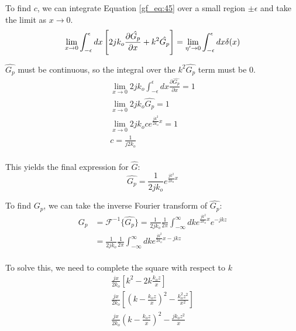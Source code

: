 To find $c$, we can integrate Equation \ref{gf_eq:45} over a small region $\pm\epsilon$ and take the limit as $x\rightarrow 0$.
\begin{equation}
\lim_{x\rightarrow 0}\int_{-\epsilon}^{\epsilon}dx\left[2jk_o\frac{\partial\hat{G_p}}{\partial x}+ k^2\hat{G_p} \right] = \lim_{\eta'\rightarrow 0}\int_{-\epsilon}^{\epsilon}dx\delta(x)\\
\label{gf_eq:47}
\end{equation}

$\hat{G_p}$ must be continuous, so the integral over the $k^2\hat{G_p}$ term must be 0.
\begin{equation}
\begin{gathered}
\lim_{x\rightarrow 0}2jk_o\int_{-\epsilon}^{\epsilon}dx\frac{\partial\hat{G_p}}{\partial x}= 1\\
\lim_{x\rightarrow 0}2jk_o\hat{G_p} = 1 \\
\lim_{x\rightarrow 0}2jk_oce^{\frac{jk^2}{2k_o}x} = 1\\
c = \frac{1}{j2k_o}\\
\end{gathered}
\label{mp_eq:11cb}
\end{equation}

This yields the final expression for $\hat{G}$:
\begin{equation}
\boxed{\hat{G_p}= \frac{1}{2jk_o}e^{\frac{jk^2}{2k_o}x}}
\label{mp_eq:11cc}
\end{equation}

To find $G_p$, we can take the inverse Fourier transform of $\hat{G_p}$:
\begin{equation}
\begin{aligned}
G_p &= \mathcal{F}^{-1}\{\hat{G_p}\} = \frac{1}{2jk_o}\frac{1}{2\pi}\int_{-\infty}^{\infty}dk e^{\frac{jk^2}{2k_o}x}e^{-jkz} \\
& = \frac{1}{2jk_o}\frac{1}{2\pi}\int_{-\infty}^{\infty}dk e^{\frac{jk^2}{2k_o}x-jkz} \\
\end{aligned}
\label{mp_eq:11d}
\end{equation}

To solve this, we need to complete the square with respect to $k$
\begin{equation}
\begin{gathered}
\frac{jx}{2k_o}\left[k^2  -2k\frac{k_oz}{x}\right]\\
\frac{jx}{2k_o}\left[\left(k - \frac{k_oz}{x}\right)^2 - \frac{k_o^2z^2}{x^2} \right]\\
\frac{jx}{2k_o}\left(k - \frac{k_oz}{x}\right)^2 - \frac{jk_oz^2}{x}\\
\end{gathered}
\label{mp_eq:11e}
\end{equation}

